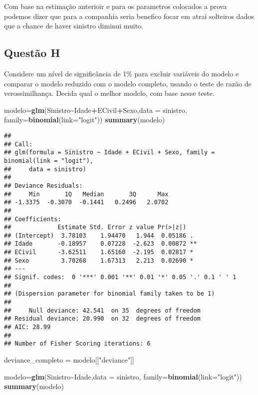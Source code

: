 \documentclass[
]{article}
\newenvironment{Shaded}{\begin{snugshade}}{\end{snugshade}}
\newcommand{\AttributeTok}[1]{\textcolor[rgb]{0.13,0.29,0.53}{#1}}
\newcommand{\FunctionTok}[1]{\textcolor[rgb]{0.13,0.29,0.53}{\textbf{#1}}}
\newcommand{\NormalTok}[1]{#1}
\newcommand{\OtherTok}[1]{\textcolor[rgb]{0.56,0.35,0.01}{#1}}
\newcommand{\SpecialCharTok}[1]{\textcolor[rgb]{0.81,0.36,0.00}{\textbf{#1}}}
\newcommand{\StringTok}[1]{\textcolor[rgb]{0.31,0.60,0.02}{#1}}
\begin{document}
Com base na estimação anterioir e para os parametros colocados a prova
podemos dizer que para a companhia seria benefico focar em atrai
solteiros dados que a chance de haver sinistro diminui muito.

\hypertarget{questuxe3o-h}{%
\subsection{Questão H}\label{questuxe3o-h}}

Considere um nível de significância de 1\% para excluir variáveis do
modelo e comparar o modelo reduzido com o modelo completo, usando o
teste de razão de verossimilhança. Decida qual o melhor modelo, com base
nesse teste.

\begin{Shaded}
\begin{Highlighting}[]
\NormalTok{modelo}\OtherTok{=}\FunctionTok{glm}\NormalTok{(Sinistro}\SpecialCharTok{\textasciitilde{}}\NormalTok{Idade}\SpecialCharTok{+}\NormalTok{ECivil}\SpecialCharTok{+}\NormalTok{Sexo,}\AttributeTok{data =}\NormalTok{ sinistro,}
           \AttributeTok{family=}\FunctionTok{binomial}\NormalTok{(}\AttributeTok{link=}\StringTok{"logit"}\NormalTok{))}
\FunctionTok{summary}\NormalTok{(modelo)}
\end{Highlighting}
\end{Shaded}

\begin{verbatim}
## 
## Call:
## glm(formula = Sinistro ~ Idade + ECivil + Sexo, family = binomial(link = "logit"), 
##     data = sinistro)
## 
## Deviance Residuals: 
##     Min       1Q   Median       3Q      Max  
## -1.3375  -0.3070  -0.1441   0.2496   2.0702  
## 
## Coefficients:
##             Estimate Std. Error z value Pr(>|z|)   
## (Intercept)  3.78103    1.94470   1.944  0.05186 . 
## Idade       -0.18957    0.07228  -2.623  0.00872 **
## ECivil      -3.62511    1.65160  -2.195  0.02817 * 
## Sexo         3.70268    1.67313   2.213  0.02690 * 
## ---
## Signif. codes:  0 '***' 0.001 '**' 0.01 '*' 0.05 '.' 0.1 ' ' 1
## 
## (Dispersion parameter for binomial family taken to be 1)
## 
##     Null deviance: 42.541  on 35  degrees of freedom
## Residual deviance: 20.990  on 32  degrees of freedom
## AIC: 28.99
## 
## Number of Fisher Scoring iterations: 6
\end{verbatim}

\begin{Shaded}
\begin{Highlighting}[]
\NormalTok{deviance\_completo }\OtherTok{=}\NormalTok{ modelo[[}\StringTok{"deviance"}\NormalTok{]]}

\NormalTok{modelo}\OtherTok{=}\FunctionTok{glm}\NormalTok{(Sinistro}\SpecialCharTok{\textasciitilde{}}\NormalTok{Idade,}\AttributeTok{data =}\NormalTok{ sinistro,}
           \AttributeTok{family=}\FunctionTok{binomial}\NormalTok{(}\AttributeTok{link=}\StringTok{"logit"}\NormalTok{))}
\FunctionTok{summary}\NormalTok{(modelo)}
\end{Highlighting}
\end{Shaded}
\end{document}
